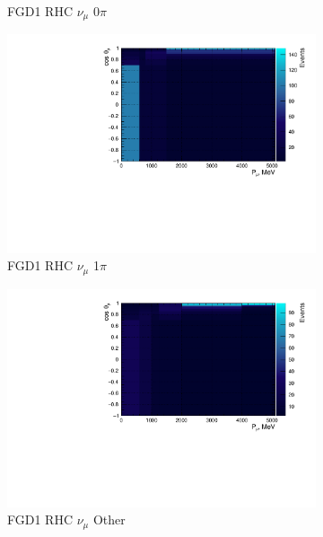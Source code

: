 \begin{figure}
\begin{subfigure}{.32\textwidth}
  \caption{FGD1 RHC $\nu_{\mu}$ 0$\pi$}
  \label{fig:2d_FGD1_NuMuBkg_CC0pi_in_AntiNu_Mode}
\end{subfigure}
\begin{subfigure}{.32\textwidth}
  \centering
  \includegraphics[width=0.95\linewidth]{figs/NomMC_MC_FGD1_NuMuBkg_CC1pi_in_AntiNu_Mode}
  \caption{FGD1 RHC $\nu_{\mu}$ 1$\pi$}
  \label{fig:2d_FGD1_NuMuBkg_CC1pi_in_AntiNu_Mode}
\end{subfigure}
\begin{subfigure}{.32\textwidth}
  \centering
  \includegraphics[width=0.95\linewidth]{figs/NomMC_MC_FGD1_NuMuBkg_CCOther_in_AntiNu_Mode}
  \caption{FGD1 RHC $\nu_{\mu}$ Other}
  \label{fig:2d_FGD1_NuMuBkg_CCOther_in_AntiNu_Mode}
\end{subfigure}
\begin{subfigure}{.32\textwidth}
  \centering

\end{subfigure}
\end{figure}
